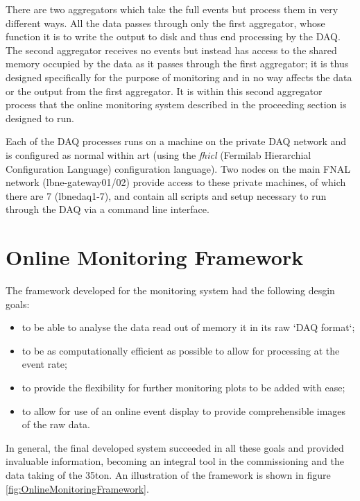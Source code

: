 There are two aggregators which take the full events but process them in very different ways.  All the data passes through only the first aggregator, whose function it is to write the output to disk and thus end processing by the DAQ.  The second aggregator receives no events but instead has access to the shared memory occupied by the data as it passes through the first aggregator; it is thus designed specifically for the purpose of monitoring and in no way affects the data or the output from the first aggregator.  It is within this second aggregator process that the online monitoring system described in the proceeding section is designed to run.

Each of the DAQ processes runs on a machine on the private DAQ network and is configured as normal within art (using the \textit{fhicl} (Fermilab Hierarchial Configuration Language) configuration language).  Two nodes on the main FNAL network (lbne-gateway01/02) provide access to these private machines, of which there are 7 (lbnedaq1-7), and contain all scripts and setup necessary to run through the DAQ via a command line interface.

\section{Online Monitoring Framework}\label{sec:OnlineMonitoring}

The framework developed for the monitoring system had the following desgin goals:

\begin{itemize}
\item to be able to analyse the data read out of memory it in its raw `DAQ format`;
\item to be as computationally efficient as possible to allow for processing at the event rate;
\item to provide the flexibility for further monitoring plots to be added with ease;
\item to allow for use of an online event display to provide comprehensible images of the raw data.
\end{itemize}

In general, the final developed system succeeded in all these goals and provided invaluable information, becoming an integral tool in the commissioning and the data taking of the 35ton.  An illustration of the framework is shown in figure \ref{fig:OnlineMonitoringFramework}.

